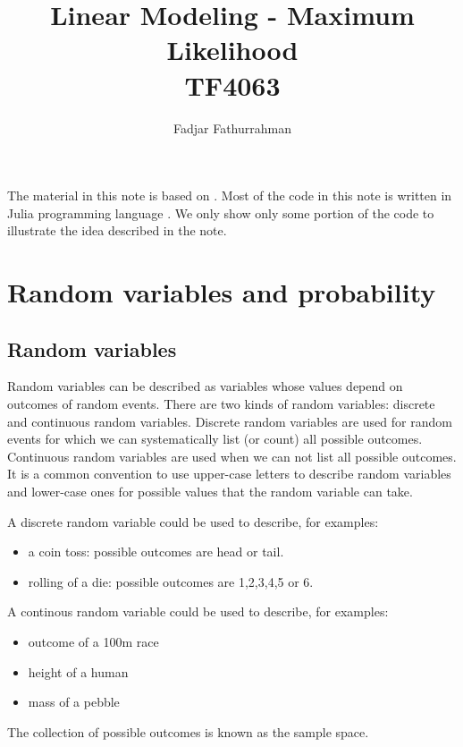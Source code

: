 \documentclass[a4paper,11pt]{article} %
\begin{document}
\title{Linear Modeling - Maximum Likelihood\\
TF4063}
\author{Fadjar Fathurrahman}
\date{}
\maketitle

The material in this note is based on \cite{Rogers2017}.
Most of the code in this note is written in Julia programming language
\cite{Bezanson2017,juliaorg}.
We only show only some portion of the code to illustrate the idea described in the
note.

\section{Random variables and probability}

\subsection{Random variables}

Random variables can be described as variables whose values depend on
outcomes of random events. There are two kinds of random variables:
discrete and continuous random variables. Discrete random variables are used
for random events for which we can systematically list (or count) all possible
outcomes. Continuous random variables are used when we can not list all
possible outcomes.
It is a common convention to use upper-case letters to describe random variables
and lower-case ones for possible values that the random variable can take.

A discrete random variable could be used to describe, for examples:
\begin{itemize}
\item a coin toss: possible outcomes are head or tail.
\item rolling of a die: possible outcomes are 1,2,3,4,5 or 6.
\end{itemize}

A continous random variable could be used to describe, for examples:
\begin{itemize}
\item outcome of a 100m race
\item height of a human
\item mass of a pebble
\end{itemize}

The collection of possible outcomes is known as the sample space.
\end{document}
